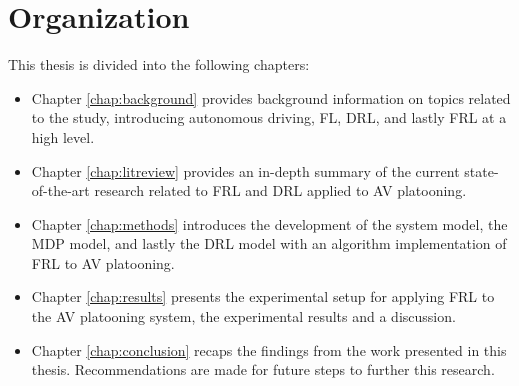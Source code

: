 \section{Organization}
This thesis is divided into the following chapters:

\begin{itemize}
    \item Chapter \ref{chap:background} provides background information on topics related to the study, introducing autonomous driving, FL, DRL, and lastly FRL at a high level.
    \vspace{12pt}
    \item Chapter \ref{chap:litreview} provides an in-depth summary of the current state-of-the-art research related to FRL and DRL applied to AV platooning. 
    \vspace{12pt}
    \item Chapter \ref{chap:methods} introduces the development of the system model, the MDP model, and lastly the DRL model with an algorithm implementation of FRL to AV platooning.
    \vspace{12pt}
    \item Chapter \ref{chap:results} presents the experimental setup for applying FRL to the AV platooning system, the experimental results and a discussion. 
    \vspace{12pt}
    \item Chapter \ref{chap:conclusion} recaps the findings from the work presented in this thesis. Recommendations are made for future steps to further this research.
\end{itemize}

